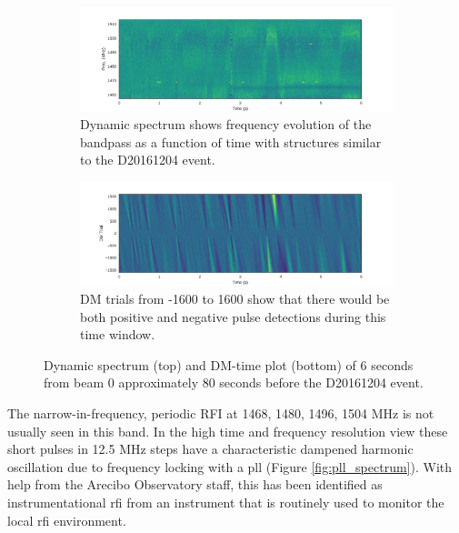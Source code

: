 \documentclass[a4paper,fleqn,usenatbib]{mnras}
\begin{document}
\begin{figure}
    \centering
    \begin{subfigure}[t]{1.0\textwidth}
        \centering\captionsetup{width=.95\linewidth}
        \includegraphics[width=1.0\textwidth]{figures/D20161204_spect_buf21_Beam0.pdf}
        \caption{Dynamic spectrum shows frequency evolution of the bandpass as a
        function of time with structures similar to the D20161204 event.
        }
        \label{fig:beam0_dynamic_spec_80s}
    \end{subfigure}
    \begin{subfigure}[t]{1.0\textwidth}
        \centering\captionsetup{width=.95\linewidth}
        \includegraphics[width=1.0\textwidth]{figures/D20161204_dmtrials_buf21_Beam0.pdf}
        \caption{DM trials from -1600 to 1600 show that there would be both
        positive and negative pulse detections during this time window.
        }
        \label{fig:beam0_dmtrials_80s}
    \end{subfigure}
    \caption{Dynamic spectrum (top) and DM-time plot (bottom) of 6 seconds from
    beam 0 approximately 80 seconds before the D20161204 event.
    }
    \label{fig:beamo0_80s}
\end{figure}

The narrow-in-frequency, periodic RFI at 1468, 1480, 1496,
1504 MHz is not usually seen in this band. In the high time and frequency
resolution view these short pulses in 12.5 MHz steps have a characteristic
dampened harmonic oscillation due to frequency locking with a \gls{pll} (Figure
\ref{fig:pll_spectrum}). With help from the Arecibo Observatory staff, this has
been identified as instrumentational \gls{rfi} from an instrument that is
routinely used to monitor the local \gls{rfi} environment.
\end{document}
